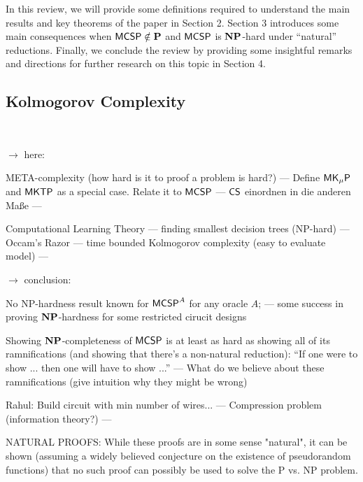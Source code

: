 \documentclass[11pt]{article}
\begin{document}
In this review, we will provide some definitions required to understand the main results and key theorems of the paper in Section 2. Section 3 introduces some main consequences when $\mathsf{MCSP} \notin \mathbf{P}$ and $\mathsf{MCSP}$ is $\mathbf{NP}$-hard under ``natural'' reductions. Finally, we conclude the review by providing some insightful remarks and directions for further research on this topic in Section 4.


\newpage
\subsection{Kolmogorov Complexity}
\

$\to$ here:

\medskip

\noindent
META-complexity (how hard is it to proof a problem is hard?)
---
Define $\mathsf{M} \mathsf{K}_\mu \mathsf{P}$
and
$\mathsf{MKTP}$
as a special case.
Relate it to $\mathsf{MCSP}$
---
$\mathsf{CS}$ einordnen in die anderen Maße
---

\medskip

\noindent
Computational Learning Theory
---
finding smallest decision trees (NP-hard)
---
Occam's Razor
---
time bounded Kolmogorov complexity (easy to evaluate model)
---

\medskip

$\to$ conclusion:

\medskip
\noindent
No NP-hardness result known for $\mathsf{MCSP}^A$ for any oracle $A$;
---
some success in proving $\mathbf{NP}$-hardness for some restricted cirucit designs

\medskip

\noindent
Showing $\mathbf{NP}$-completeness of $\mathsf{MCSP}$ is at least as hard as showing
all of its ramnifications (and showing that there's a non-natural reduction):
``If one were to show ... then one will have to show ...''
---
What do we believe about these ramnifications (give intuition why they might
be wrong)

\medskip

\noindent
Rahul:
Build circuit with min number of wires...
---
Compression problem (information theory?)
---


NATURAL PROOFS: While these proofs are in some sense "natural", it can be shown (assuming a widely believed conjecture on the existence of pseudorandom functions) that no such proof can possibly be used to solve the P vs. NP problem.
\end{document}
